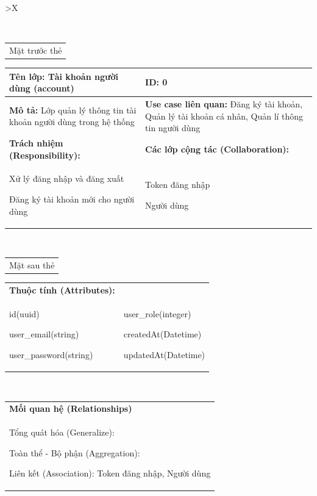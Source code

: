 \begin{xltabular}{\textwidth}{
		>{\centering\arraybackslash}X
	}
	\caption{\bfseries \fontsize{12pt}{0pt}\selectfont Thẻ CRC lớp Tài khoản người dùng}
	\\
	\begin{tabularx}{0.9\textwidth}{X}
		Mặt trước thẻ
	\end{tabularx}
	\begin{tabularx}{0.9\textwidth}{|X|X|}
		\hline
		\textbf{Tên lớp:} Tài khoản người dùng (account)                          & \textbf{ID:} 0                                                                                           \\
		\hline
		\textbf{Mô tả:} Lớp quản lý thông tin tài khoản người dùng trong hệ thống & \textbf{Use case liên quan:}  Đăng ký tài khoản, Quản lý tài khoản cá nhân, Quản lí thông tin người dùng \\
		\hline
		\textbf{Trách nhiệm (Responsibility):}                                    & \textbf{Các lớp cộng tác (Collaboration):}                                                               \\
		Xử lý đăng nhập và đăng xuất

		Đăng ký tài khoản mới cho người dùng
		                                                                          &
		Token đăng nhập

		Người dùng
		\\
		\hline
	\end{tabularx}
	\\
	\begin{tabularx}{0.9\textwidth}{X}
		Mặt sau thẻ
	\end{tabularx}
	\begin{tabularx}{0.9\textwidth}{|X|X|}
		\hline
		\textbf{Thuộc tính (Attributes):} & \\
		id(uuid)

		user\_email(string)

		user\_password(string)
		                                  &
		user\_role(integer)

		createdAt(Datetime)

		updatedAt(Datetime)
		\\ \hline
	\end{tabularx}
	\\
	\begin{tabularx}{0.9\textwidth}{|X|}
		\hline
		\textbf{Mối quan hệ (Relationships)} \\
		Tổng quát hóa (Generalize):

		Toàn thể - Bộ phận (Aggregation):

		Liên kết (Association): Token đăng nhập, Người dùng
		\\
		\hline
	\end{tabularx}
\end{xltabular}

